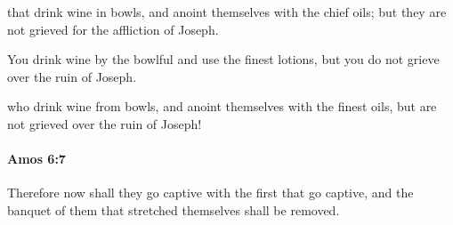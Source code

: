 			\begin{versebox}
					\item[BHS] 
					\item[LXX] 
					\item[ASV] that drink wine in bowls, and anoint themselves with the chief oils; but they are not grieved for the affliction of Joseph.
					\item[NIV] You drink wine by the bowlful and use the finest lotions, but you do not grieve over the ruin of Joseph.
					\item[NRSV] who drink wine from bowls, and anoint themselves with the finest oils, but are not grieved over the ruin of Joseph!
			\end{versebox}

		\paragraph{Amos 6:7} %
			\label{AMOS-6-7}

			Therefore now shall they go captive with the first that go captive, and the banquet of them that stretched themselves shall be removed.

